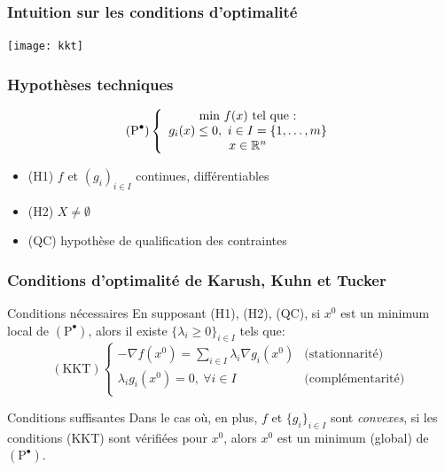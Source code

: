 \documentclass{beamer}
\newcommand{\R}{{\ensuremath\mathbb{R}}}
\begin{document}
\begin{frame}
  \frametitle{Intuition sur les conditions d'optimalité}

  \begin{center}
      \texttt{[image: kkt]}    
  \end{center}

\end{frame}

\begin{frame}
  \frametitle{Hypothèses techniques}

  \[
  (\text{P}^\bullet) \left\{
  \begin{array}{c}
    \text{min} \ f(x) \ \text{tel que :} \\
    g_i(x) \leq 0, \ i \in I = \{1, \dots, m\} \\
    x \in \R^n
  \end{array}
  \right.
  \]

  \begin{itemize}
  \item (H1) $f$ et $(g_i)_{i \in I}$ continues, différentiables
  \item (H2) $X \neq \emptyset$
  \item (QC) hypothèse de qualification des contraintes
  \end{itemize}
  
\end{frame}

\begin{frame}
  \frametitle{Conditions d'optimalité de Karush, Kuhn et Tucker}

  \begin{block}{Conditions nécessaires}
    En supposant (H1), (H2), (QC), si $x^0$ est un minimum local de $(\text{P}^\bullet)$,
    alors il existe $\{\lambda_i \geq 0\}_{i \in I}$ tels que:
    \[
    (\text{KKT})
    \left\{
    \begin{array}{ll}
      -{\nabla f}(x^0) = \sum_{i \in I} \lambda_i {\nabla g_i}(x^0)
      & \text{(stationnarité)} \\
      \lambda_i g_i(x^0) = 0, \ \forall i \in I
      & \text{(complémentarité)} \\
    \end{array}
    \right.
    \]
  \end{block}

  \begin{block}{Conditions suffisantes}
    Dans le cas où, en plus, $f$ et $\{g_i\}_{i\in I}$ sont \emph{convexes},
    si les conditions (KKT) sont vérifiées pour $x^0$, alors $x^0$ est un minimum
    (global) de $(\text{P}^\bullet)$.  
  \end{block}
  
\end{frame}
\end{document}
